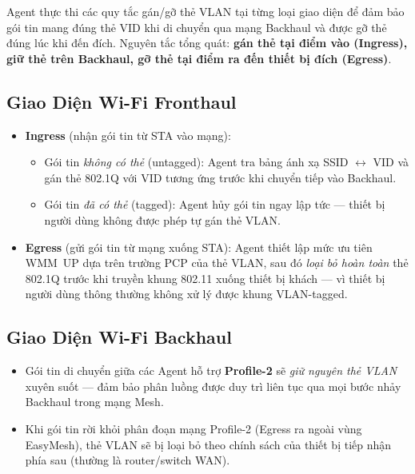 Agent thực thi các quy tắc gán/gỡ thẻ VLAN tại từng loại giao diện để đảm bảo gói
tin mang đúng thẻ VID khi di chuyển qua mạng Backhaul và được gỡ thẻ đúng lúc khi
đến đích. Nguyên tắc tổng quát: \textbf{gán thẻ tại điểm vào (Ingress), giữ
	thẻ trên Backhaul, gỡ thẻ tại điểm ra đến thiết bị đích (Egress)}.


\subsection{Giao Diện Wi-Fi Fronthaul}

\begin{itemize}
	\item \textbf{Ingress} (nhận gói tin từ STA vào mạng):
	\begin{itemize}
		\item Gói tin \textit{không có thẻ} (untagged): Agent tra bảng ánh xạ SSID
		$\leftrightarrow$ VID và gán thẻ 802.1Q với VID tương ứng trước khi
		chuyển tiếp vào Backhaul.
		\item Gói tin \textit{đã có thẻ} (tagged): Agent hủy gói tin ngay lập tức
		--- thiết bị người dùng không được phép tự gán thẻ VLAN.
	\end{itemize}
	\item \textbf{Egress} (gửi gói tin từ mạng xuống STA):
	Agent thiết lập mức ưu tiên WMM~UP dựa trên trường PCP của thẻ VLAN, sau đó
	\textit{loại bỏ hoàn toàn} thẻ 802.1Q trước khi truyền khung 802.11 xuống
	thiết bị khách --- vì thiết bị người dùng thông thường không xử lý được
	khung VLAN-tagged.
\end{itemize}


\subsection{Giao Diện Wi-Fi Backhaul}

\begin{itemize}
	\item Gói tin di chuyển giữa các Agent hỗ trợ \textbf{Profile-2} sẽ
	\textit{giữ nguyên thẻ VLAN} xuyên suốt --- đảm bảo phân luồng được duy
	trì liên tục qua mọi bước nhảy Backhaul trong mạng Mesh.
	\item Khi gói tin rời khỏi phân đoạn mạng Profile-2 (Egress ra ngoài vùng
	EasyMesh), thẻ VLAN sẽ bị loại bỏ theo chính sách của thiết bị tiếp nhận
	phía sau (thường là router/switch WAN).
\end{itemize}


